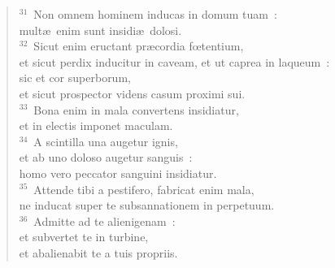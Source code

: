 \begin{flushleft}\begin{verse}${}^{31}$~Non omnem hominem inducas in domum tuam~:\\ mult\ae\ enim sunt insidi\ae\ dolosi.\\
${}^{32}$~Sicut enim eructant pr\ae cordia fœtentium,\\ et sicut perdix inducitur in caveam, et ut caprea in laqueum~:\\ sic et cor superborum,\\ et sicut prospector videns casum proximi sui.\\
${}^{33}$~Bona enim in mala convertens insidiatur,\\ et in electis imponet maculam.\\
${}^{34}$~A scintilla una augetur ignis,\\ et ab uno doloso augetur sanguis~:\\ homo vero peccator sanguini insidiatur.\\
${}^{35}$~Attende tibi a pestifero, fabricat enim mala,\\ ne inducat super te subsannationem in perpetuum.\\
${}^{36}$~Admitte ad te alienigenam~:\\ et subvertet te in turbine,\\ et abalienabit te a tuis propriis.\end{verse}\end{flushleft}


